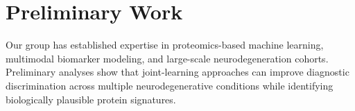 \section{Preliminary Work}

Our group has established expertise in proteomics-based machine
learning, multimodal biomarker modeling, and large-scale
neurodegeneration cohorts. Preliminary analyses show that joint-learning
approaches can improve diagnostic discrimination across multiple
neurodegenerative conditions while identifying biologically plausible
protein signatures.
